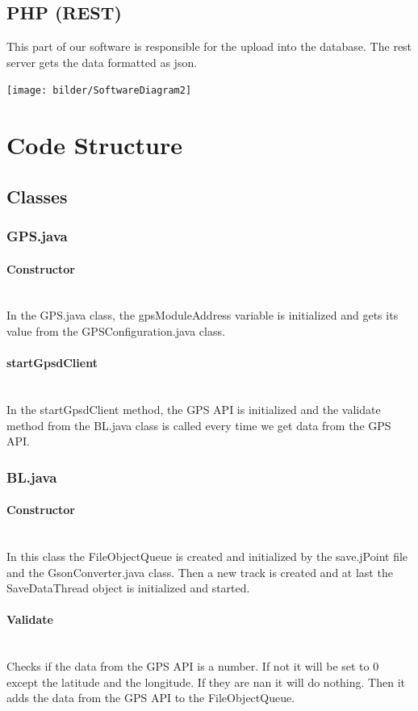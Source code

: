 \subsection{PHP (REST)}
This part of our software is responsible for the upload into the database. The \gls{rest} server gets the data formatted as \gls{json}.
\begin{center}
\texttt{[image: bilder/SoftwareDiagram2]}
\end{center} 
\clearpageauthor
\section{Code Structure}
\subsection{Classes}
\subsubsection{GPS.java}
\paragraph{Constructor}\mbox{}\\
In the GPS.java class, the gpsModuleAddress variable is initialized and gets its value from the GPSConfiguration.java class.
\paragraph{startGpsdClient}\mbox{}\\
In the startGpsdClient method, the GPS API is initialized and the validate method from the BL.java class is called every time we get data from the GPS API.
\subsubsection{BL.java}
\paragraph{Constructor}\mbox{}\\
In this class the FileObjectQueue is created and initialized by the save.jPoint file and the GsonConverter.java class. 
Then a new track is created and at last the SaveDataThread object is initialized and started.
\paragraph{Validate}\mbox{}\\
Checks if the data from the GPS API is a number. If not it will be set to 0 except the latitude and the longitude. If they are \gls{nan} it will do nothing. 
Then it adds the data from the GPS API to the FileObjectQueue.
